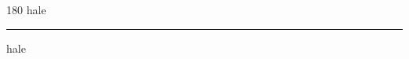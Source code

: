 
\begin{frame}
\begin{center}
\begin{turn}{180}
{\fontsize{2.5cm}{1em}\selectfont hale}
\end{turn}
\vspace{1em}\par  
\hrule
\vspace{1em}\par  
{\fontsize{2.5cm}{1em}\selectfont hale}
\end{center}
\end{frame}
